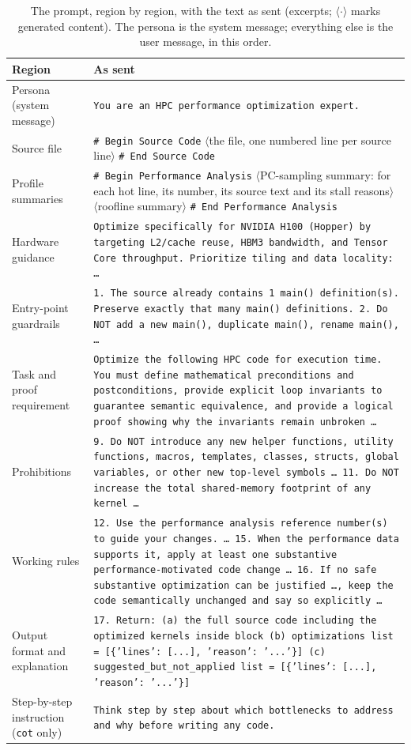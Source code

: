 \begin{table}[t]
\centering
\footnotesize
\caption{The prompt, region by region, with the text as sent (excerpts; $\langle\cdot\rangle$ marks
  generated content). The persona is the system message; everything else is the user message, in this
  order.}
\label{tab:prompt}
\begin{tabular}{@{}p{}p{}@{}}
\toprule
\textbf{Region} & \textbf{As sent} \\
\midrule
Persona (system message) & \texttt{You are an HPC performance optimization expert.} \\
Source file & \texttt{\# Begin Source Code} $\langle$the file, one numbered line per source line$\rangle$
  \texttt{\# End Source Code} \\
Profile summaries & \texttt{\# Begin Performance Analysis} $\langle$PC-sampling summary: for each hot
  line, its number, its source text and its stall reasons$\rangle$ $\langle$roofline summary$\rangle$
  \texttt{\# End Performance Analysis} \\
Hardware guidance & \texttt{Optimize specifically for NVIDIA H100 (Hopper) by targeting L2/cache reuse,
  HBM3 bandwidth, and Tensor Core throughput. Prioritize tiling and data locality: \ldots} \\
Entry-point guardrails & \texttt{1. The source already contains 1 main() definition(s). Preserve exactly
  that many main() definitions. 2. Do NOT add a new main(), duplicate main(), rename main(), \ldots} \\
Task and proof requirement & \texttt{Optimize the following HPC code for execution time. You must define
  mathematical preconditions and postconditions, provide explicit loop invariants to guarantee semantic
  equivalence, and provide a logical proof showing why the invariants remain unbroken \ldots} \\
Prohibitions & \texttt{9. Do NOT introduce any new helper functions, utility functions, macros,
  templates, classes, structs, global variables, or other new top-level symbols \ldots\
  11. Do NOT increase the total shared-memory footprint of any kernel \ldots} \\
Working rules & \texttt{12. Use the performance analysis reference number(s) to guide your changes.
  \ldots\ 15. When the performance data supports it, apply at least one substantive
  performance-motivated code change \ldots\ 16. If no safe substantive optimization can be justified
  \ldots, keep the code semantically unchanged and say so explicitly \ldots} \\
Output format and explanation & \texttt{17. Return: (a) the full source code including the optimized
  kernels inside {\textasciigrave\textasciigrave\textasciigrave} block (b) optimizations list = [\{'lines': [...], 'reason': '...'\}] (c)
  suggested\_but\_not\_applied list = [\{'lines': [...], 'reason': '...'\}]} \\
Step-by-step instruction (\texttt{cot} only) & \texttt{Think step by step about which bottlenecks to
  address and why before writing any code.} \\
\bottomrule
\end{tabular}
\end{table}

